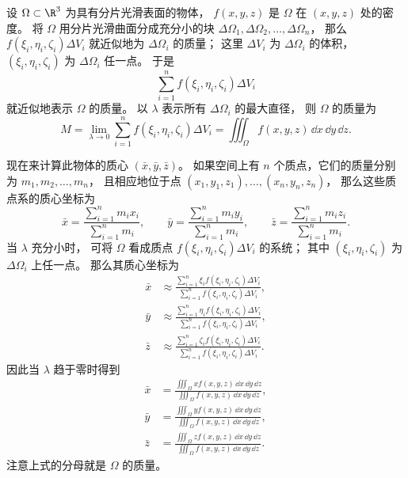 \begin{example}
设 $\Omega\subset\R^3$ 为具有分片光滑表面的物体，
$f(x,y,z)$ 是 $\Omega$ 在 $(x,y,z)$ 处的密度。
将 $\Omega$ 用分片光滑曲面分成充分小的块
$\Delta\Omega_1,\Delta\Omega_2,\ldots,\Delta\Omega_n$，
那么 $f(\xi_i,\eta_i,\zeta_i)\Delta V_i$
就近似地为 $\Delta\Omega_i$ 的质量；
这里 $\Delta V_i$ 为 $\Delta\Omega_i$ 的体积，
$(\xi_i,\eta_i,\zeta_i)$ 为 $\Delta\Omega_i$ 任一点。
于是
\[
\sum_{i=1}^n f(\xi_i,\eta_i,\zeta_i)\Delta V_i
\]
就近似地表示 $\Omega$ 的质量。
以 $\lambda$ 表示所有 $\Delta\Omega_i$ 的最大直径，
则 $\Omega$ 的质量为
\[
M=\lim_{\lambda\to0}
\sum_{i=1}^n f(\xi_i,\eta_i,\zeta_i)\Delta V_i
=\iiint_\Omega f(x,y,z)\,\dd x\,\dd y\,\dd z.
\]

现在来计算此物体的质心
$(\bar x,\bar y,\bar z)$。
如果空间上有 $n$ 个质点，它们的质量分别为
$m_1,m_2,\ldots,m_n$，
且相应地位于点
$(x_1,y_1,z_1),\ldots,(x_n,y_n,z_n)$，
那么这些质点系的质心坐标为
\[
\bar x=\frac{\sum_{i=1}^n m_i x_i}{\sum_{i=1}^n m_i},
\qquad
\bar y=\frac{\sum_{i=1}^n m_i y_i}{\sum_{i=1}^n m_i},
\qquad
\bar z=\frac{\sum_{i=1}^n m_i z_i}{\sum_{i=1}^n m_i}.
\]
当 $\lambda$ 充分小时，
可将 $\Omega$ 看成质点
$f(\xi_i,\eta_i,\zeta_i)\Delta V_i$ 的系统；
其中 $(\xi_i,\eta_i,\zeta_i)$ 为
$\Delta\Omega_i$ 上任一点。
那么其质心坐标为
\[
\begin{aligned}
\bar x&\approx
\frac{\sum_{i=1}^n
\xi_i f(\xi_i,\eta_i,\zeta_i)\Delta V_i}
{\sum_{i=1}^n f(\xi_i,\eta_i,\zeta_i)\Delta V_i},\\
\bar y&\approx
\frac{\sum_{i=1}^n
\eta_i f(\xi_i,\eta_i,\zeta_i)\Delta V_i}
{\sum_{i=1}^n f(\xi_i,\eta_i,\zeta_i)\Delta V_i},\\
\bar z&\approx
\frac{\sum_{i=1}^n
\zeta_i f(\xi_i,\eta_i,\zeta_i)\Delta V_i}
{\sum_{i=1}^n f(\xi_i,\eta_i,\zeta_i)\Delta V_i}.
\end{aligned}
\]
因此当 $\lambda$ 趋于零时得到
\[
\begin{aligned}
\bar x&=
\frac{\iiint_\Omega x f(x,y,z)\,\dd x\,\dd y\,\dd z}
{\iiint_\Omega f(x,y,z)\,\dd x\,\dd y\,\dd z},\\
\bar y&=
\frac{\iiint_\Omega y f(x,y,z)\,\dd x\,\dd y\,\dd z}
{\iiint_\Omega f(x,y,z)\,\dd x\,\dd y\,\dd z},\\
\bar z&=
\frac{\iiint_\Omega z f(x,y,z)\,\dd x\,\dd y\,\dd z}
{\iiint_\Omega f(x,y,z)\,\dd x\,\dd y\,\dd z}.
\end{aligned}
\]
注意上式的分母就是 $\Omega$ 的质量。
\end{example}

